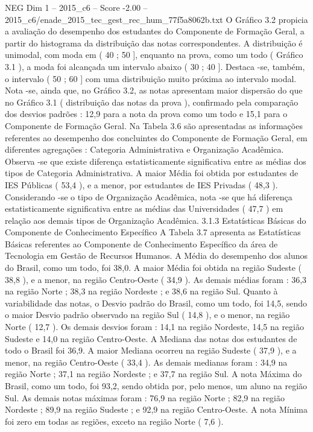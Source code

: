 \begin{textsample}{NEG Dim 1 – 2015\_c6 – Score -2.00 – 2015\_c6/enade\_2015\_tec\_gest\_rec\_hum\_77f5a8062b.txt}
O Gráfico 3.2 propicia a avaliação do desempenho dos estudantes do Componente de Formação Geral, a partir do histograma da distribuição das notas correspondentes.
A distribuição é unimodal, com moda em ( 40 ; 50 ], enquanto na prova, como um todo ( Gráfico 3.1 ), a moda foi alcançada um intervalo abaixo ( 30 ; 40 ].
Destaca -se, também, o intervalo ( 50 ; 60 ] com uma distribuição muito próxima ao intervalo modal.
Nota -se, ainda que, no Gráfico 3.2, as notas apresentam maior dispersão do que no Gráfico 3.1 ( distribuição das notas da prova ), confirmado pela comparação dos desvios padrões : 12,9 para a nota da prova como um todo e 15,1 para o Componente de Formação Geral.
Na Tabela 3.6 são apresentadas as informações referentes ao desempenho dos concluintes do Componente de Formação Geral, em diferentes agregações : Categoria Administrativa e Organização Acadêmica.
Observa -se que existe diferença estatisticamente significativa entre as médias dos tipos de Categoria Administrativa.
A maior Média foi obtida por estudantes de IES Públicas ( 53,4 ), e a menor, por estudantes de IES Privadas ( 48,3 ).
Considerando -se o tipo de Organização Acadêmica, nota -se que há diferença estatisticamente significativa entre as médias das Universidades ( 47,7 ) em relação aos demais tipos de Organização Acadêmica. 3.1.3 Estatísticas Básicas do Componente de Conhecimento Específico A Tabela 3.7 apresenta as Estatísticas Básicas referentes ao Componente de Conhecimento Específico da área de Tecnologia em Gestão de Recursos Humanos.
A Média do desempenho dos alunos do Brasil, como um todo, foi 38,0.
A maior Média foi obtida na região Sudeste ( 38,8 ), e a menor, na região Centro-Oeste ( 34,9 ).
As demais médias foram : 36,3 na região Norte ; 38,3 na região Nordeste ; e 38,6 na região Sul.
Quanto à variabilidade das notas, o Desvio padrão do Brasil, como um todo, foi 14,5, sendo o maior Desvio padrão observado na região Sul ( 14,8 ), e o menor, na região Norte ( 12,7 ).
Os demais desvios foram : 14,1 na região Nordeste, 14,5 na região Sudeste e 14,0 na região Centro-Oeste.
A Mediana das notas dos estudantes de todo o Brasil foi 36,9.
A maior Mediana ocorreu na região Sudeste ( 37,9 ), e a menor, na região Centro-Oeste ( 33,4 ).
As demais medianas foram : 34,9 na região Norte ; 37,1 na região Nordeste ; e 37,7 na região Sul.
A nota Máxima do Brasil, como um todo, foi 93,2, sendo obtida por, pelo menos, um aluno na região Sul.
As demais notas máximas foram : 76,9 na região Norte ; 82,9 na região Nordeste ; 89,9 na região Sudeste ; e 92,9 na região Centro-Oeste.
A nota Mínima foi zero em todas as regiões, exceto na região Norte ( 7,6 ).

\end{textsample}
